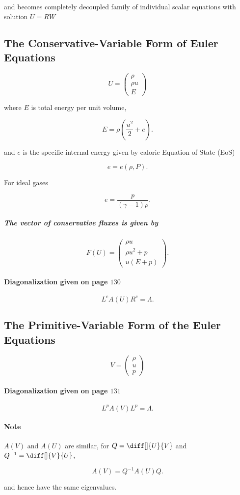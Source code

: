and becomes completely decoupled family of individual scalar equations with solution $\boxed{U = RW}$

\subsection{The Conservative-Variable Form of Euler Equations}%

\begin{equation}
  U = \begin{pmatrix}
    \rho \\ \rho u \\ E
  \end{pmatrix}
\end{equation}

where $E$ is total energy per unit volume,

\[
E = \rho \left( \frac{u^{2}}{2} + e \right)
.\] 

and $e$ is the specific internal energy given by caloric Equation of State
(EoS)

\[
e = e( \rho, P)
.\] 

For ideal gases

\[
  e = \frac{p}{ ( \gamma - 1) \rho}
.\] 

\subparagraph{The vector of conservative fluxes is given by}%

\[
  F(U) = \begin{pmatrix}
    \rho u \\ \rho u^{2} + p \\ u(E+p)
  \end{pmatrix}
.\] 

\paragraph{Diagonalization given on page $130$}%
\[
  L^{c}A(U)R^{c} = \Lambda
.\] 


\subsection{The Primitive-Variable Form of the Euler Equations}%

\begin{equation}
  V = \begin{pmatrix}
    \rho \\ u \\ p
  \end{pmatrix}
\end{equation}

\paragraph{Diagonalization given on page $131$}%
\[
  L^{p}A(V)L^{p} = \Lambda
.\] 

\paragraph{Note}%
$A(V)$ and  $A(U)$ are similar, for $Q = \diff[]{U}{V}$ and $Q^{-1}
= \diff[]{V}{U}$,

\[
  A(V) = Q^{-1}A(U)Q
.\] 

and hence have the same eigenvalues.



